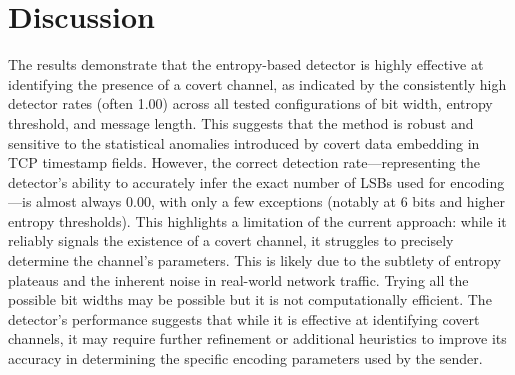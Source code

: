\documentclass[10pt,a4paper]{article}
\begin{document}
\section*{Discussion}

The results demonstrate that the entropy-based detector is highly effective at identifying the presence of a covert channel, as indicated by the consistently high detector rates (often 1.00) across all tested configurations of bit width, entropy threshold, and message length.
 This suggests that the method is robust and sensitive to the statistical anomalies introduced by covert data embedding in TCP timestamp fields.
However, the correct detection rate—representing the detector's ability to accurately infer the exact number of LSBs used for encoding—is almost always 0.00, with only a few exceptions (notably at 6 bits and higher entropy thresholds).
 This highlights a limitation of the current approach: while it reliably signals the existence of a covert channel, it struggles to precisely determine the channel's parameters. 
This is likely due to the subtlety of entropy plateaus and the inherent noise in real-world network traffic.
Trying all the possible bit widths may be possible but it is not computationally efficient.
The detector's performance suggests that while it is effective at identifying covert channels, it may require further refinement or additional heuristics to improve its accuracy in determining the specific encoding parameters used by the sender.
\end{document}
